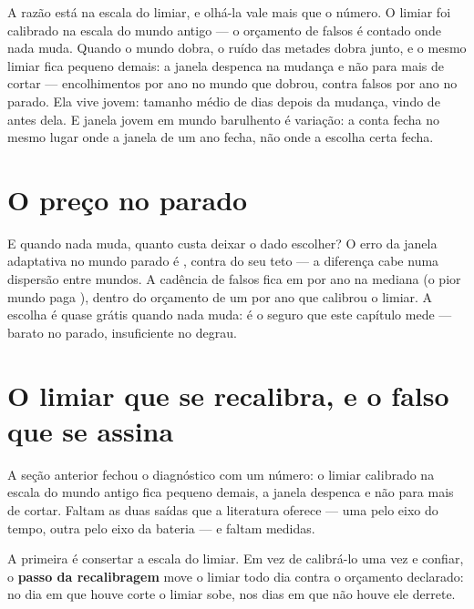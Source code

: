 A razão está na escala do limiar, e olhá-la vale mais que o número. O limiar foi calibrado na
escala do mundo antigo --- o orçamento de falsos é contado onde nada muda. Quando o mundo dobra, o
ruído das metades dobra junto, e o mesmo limiar fica pequeno demais: a janela despenca na mudança
e não para mais de cortar --- \numAdaptativaDegrauEncolhimentosPorAno{} encolhimentos por ano no mundo
que dobrou, contra \numAdaptativaParadoFalsosPorAnoMediana{} falsos por ano no parado. Ela vive jovem:
tamanho médio de \numAdaptativaDegrauTamanhoMedioPos{} dias depois da mudança, vindo de
\numAdaptativaDegrauTamanhoAntes{} antes dela. E janela jovem em mundo barulhento é variação: a conta
fecha no mesmo lugar onde a janela de um ano fecha, não onde a escolha certa fecha.

\section{O preço no parado}

E quando nada muda, quanto custa deixar o dado escolher? O erro da janela adaptativa no mundo
parado é \numAdaptativaParadoErroAdaptativaMediana, contra \numAdaptativaParadoErroJanelaTetoMediana{}
do seu teto --- a diferença cabe numa dispersão entre mundos. A cadência de falsos fica em
\numAdaptativaParadoFalsosPorAnoMediana{} por ano na mediana (o pior mundo paga
\numAdaptativaParadoFalsosPorAnoPior), dentro do orçamento de um por ano que calibrou o limiar. A
escolha é quase grátis quando nada muda: é o seguro que este capítulo mede --- barato no parado,
insuficiente no degrau.

\section{O limiar que se recalibra, e o falso que se assina}

A seção anterior fechou o diagnóstico com um número: o limiar calibrado na escala do mundo antigo
fica pequeno demais, a janela despenca e não para mais de cortar. Faltam as duas saídas que a
literatura oferece --- uma pelo eixo do tempo, outra pelo eixo da bateria --- e faltam medidas.

A primeira é consertar a escala do limiar. Em vez de calibrá-lo uma vez e confiar, o
\textbf{passo da recalibragem} move o limiar todo dia contra o orçamento declarado: no dia em que
houve corte o limiar sobe, nos dias em que não houve ele derrete.

